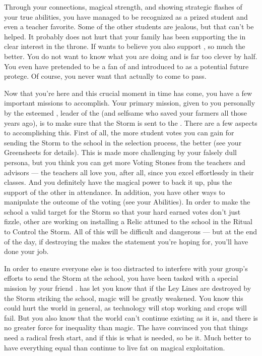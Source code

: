 \documentclass[char]{GL2020}
\begin{document}
Through your connections, magical strength, and showing strategic flashes of your true abilities, you have managed to be recognized as a prized student and even a teacher favorite. 
Some of the other students are jealous, but that can't be helped. It probably does not hurt that your family has been supporting the \cPrince{\full} in \cPrince{\their} clear interest in the throne. If \cPrince{\they} wants to believe you also support \cPrince{\them}, so much the better. You do not want \cPrince{} to know what you are doing and \cPrince{\they} is far too clever by half. You even have pretended to be a fan of \cPrince{} and introduced \cAmbition{} to \cPrince{\them} as a potential future protege. Of course, you never want that actually to come to pass.
 
Now that you're here and this crucial moment in time has come, you have a few important missions to accomplish. Your primary mission, given to you personally by the esteemed \cChupLeader{\full}, leader of the \pGoaties{} (and selfsame \cChupLeader{\person} who saved your farmers all those years ago), is to make sure that the Storm is sent to the \pSc{}. There are a few aspects to accomplishing this. First of all, the more student votes you can gain for sending the Storm to the school in the selection process, the better (see your Greensheets for details). This is made more challenging by your falsely dull persona, but you think you can get more Voting Stones from the teachers and advisors — the teachers all love you, after all, since you excel effortlessly in their classes. And you definitely have the magical power to back it up, plus the support of the other \pGoaties{} in attendance. In addition, you have other ways to manipulate the outcome of the voting (see your Abilities). In order to make the school a valid target for the Storm so that your hard earned votes don't just fizzle, other \pGoaties{} are working on installing a Relic attuned to the school in the Ritual to Control the Storm. All of this will be difficult and dangerous — but at the end of the day, if destroying the \pSchool{} makes the statement you're hoping for, you'll have done your job.
 
In order to ensure everyone else is too distracted to interfere with your group's efforts to send the Storm at the school, you have been tasked with a special mission by your friend \cChupSecond{}. \cChupLeader{} has let you know that if the Ley Lines are destroyed by the Storm striking the school, magic will be greatly weakened. You know this could hurt the world in general, as technology will stop working and crops will fail. But you also know that the world can’t continue existing as it is, and there is no greater force for inequality than magic. The \pGoaties{} have convinced you that things need a radical fresh start, and if this is what is needed, so be it. Much better to have everything equal than continue to live fat on magical exploitation.  
\end{document}
